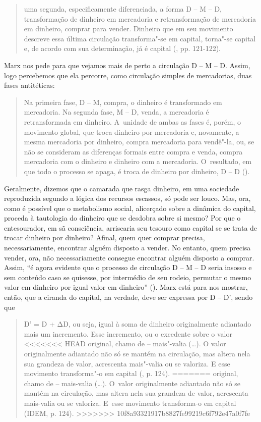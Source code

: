 {\begin{quote}
uma segunda, especificamente diferenciada, a forma D -- M -- D,
transformação de dinheiro em mercadoria e retransformação de mercadoria
em dinheiro, comprar para vender. Dinheiro que em seu movimento descreve
essa última circulação transforma"-se em capital, torna"-se capital e, de
acordo com sua determinação, já é capital (, pp. 121-122).
\end{quote}

Marx nos pede para que vejamos mais de perto a circulação D -- M -- D.
Assim, logo percebemos que ela percorre, como circulação simples de
mercadorias, duas fases antitéticas:

\begin{quote}
Na primeira fase, D -- M, compra, o dinheiro é transformado em
mercadoria. Na segunda fase, M -- D, venda, a mercadoria é
retransformada em dinheiro. A~unidade de ambas as fases é, porém, o
movimento global, que troca dinheiro por mercadoria e, novamente, a
mesma mercadoria por dinheiro, compra mercadoria para vendê"-la, ou, se
não se consideram as diferenças formais entre compra e venda, compra
mercadoria com o dinheiro e dinheiro com a mercadoria. O~resultado, em
que todo o processo se apaga, é troca de dinheiro por dinheiro, D -- D
().
\end{quote}

Geralmente, dizemos que o camarada que rasga dinheiro, em uma sociedade
reproduzida segundo a lógica dos recursos escassos, só pode ser louco.
Mas, ora, como é possível que o metabolismo social, alicerçado sobre a
dinâmica do capital, proceda à tautologia do dinheiro que se desdobra
sobre si mesmo? Por que o entesourador, em sã consciência, arriscaria
seu tesouro como capital se se trata de trocar dinheiro por dinheiro?
Afinal, quem quer comprar precisa, necessariamente, encontrar alguém
disposto a vender. No entanto, quem precisa vender, ora, não
necessariamente consegue encontrar alguém disposto a comprar. Assim, ``é
agora evidente que o processo de circulação D -- M -- D seria insosso e
sem conteúdo caso se quisesse, por intermédio de seu rodeio, permutar o
mesmo valor em dinheiro por igual valor em dinheiro'' (). Marx
está para nos mostrar, então, que a ciranda do capital, na verdade, deve
ser expressa por D -- D', sendo que

\begin{quote}
D' = D + ΔD, ou seja, igual à soma de dinheiro originalmente adiantado
mais um incremento. Esse incremento, ou o excedente sobre o valor
<<<<<<< HEAD
original, chamo de -- mais"-valia (\ldots{}). O valor originalmente
adiantado não só se mantém na circulação, mas altera nela sua grandeza
de valor, acrescenta mais"-valia ou se valoriza. E esse movimento
transforma"-o em capital (, p. 124).
=======
original, chamo de -- mais-valia (\ldots{}). O~valor originalmente
adiantado não só se mantém na circulação, mas altera nela sua grandeza
de valor, acrescenta mais-valia ou se valoriza. E~esse movimento
transforma-o em capital (IDEM, p. 124).
>>>>>>> 10f8a93321917b8827fe99219c6f792e47a0f7fe
\end{quote}

}
